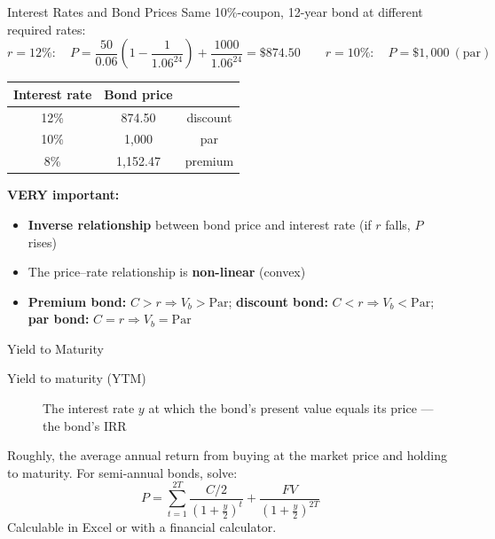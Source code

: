 \documentclass[aspectratio=169]{beamer}
\begin{document}
\begin{frame}{Interest Rates and Bond Prices}
Same 10\%-coupon, 12-year bond at different required rates:
\[
r = 12\%: \quad P = \frac{50}{0.06}\left(1-\frac{1}{1.06^{24}}\right) + \frac{1000}{1.06^{24}} = \$874.50
\qquad
r = 10\%: \quad P = \$1{,}000 \ (\text{par})
\]
\begin{center}
\begin{tabular}{ccc}
\toprule
Interest rate & Bond price & \\
\midrule
12\% & 874.50 & discount \\
10\% & 1{,}000 & par \\
8\% & 1{,}152.47 & premium \\
\bottomrule
\end{tabular}
\end{center}
\textbf{VERY important:}
\begin{itemize}
  \item \textbf{Inverse relationship} between bond price and interest rate (if $r$ falls, $P$ rises)
  \item The price--rate relationship is \textbf{non-linear} (convex)
  \item \textbf{Premium bond:} $C > r \Rightarrow V_b > \text{Par}$; \textbf{discount bond:} $C < r \Rightarrow V_b < \text{Par}$; \textbf{par bond:} $C = r \Rightarrow V_b = \text{Par}$
\end{itemize}
\end{frame}

\begin{frame}{Yield to Maturity}
\begin{description}
  \item[Yield to maturity (YTM)] The interest rate $y$ at which the bond's present value equals its price --- the bond's IRR
\end{description}
\vspace{0.2em}
Roughly, the average annual return from buying at the market price and holding to maturity. For semi-annual bonds, solve:
\[
P = \sum_{t=1}^{2T} \frac{C/2}{\left(1+\frac{y}{2}\right)^{t}} + \frac{FV}{\left(1+\frac{y}{2}\right)^{2T}}
\]
Calculable in Excel or with a financial calculator.
\end{frame}
\end{document}

